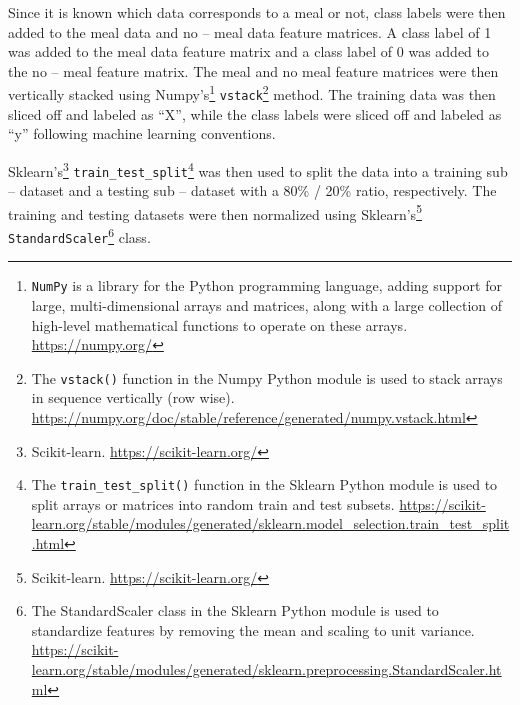 Since it is known which data corresponds to a meal or not, class labels were then added to the meal data and no -- meal data feature matrices.  A class label of 1 was added to the meal data feature matrix and a class label of 0 was added to the no -- meal feature matrix.  The meal and no meal feature matrices were then vertically stacked using Numpy's\footnote{\texttt{NumPy} is a library for the Python programming language, adding support for large, multi-dimensional arrays and matrices, along with a large collection of high-level mathematical functions to operate on these arrays. \url{https://numpy.org/}} \texttt{vstack}\footnote{The \texttt{vstack()} function in the Numpy Python module is used to stack arrays in sequence vertically (row wise). \href{https://numpy.org/doc/stable/reference/generated/numpy.vstack.html}{https://numpy.org/doc/stable/reference/generated/numpy.vstack.html}} method.  The training data was then sliced off and labeled as ``X'', while the class labels were sliced off and labeled as ``y'' following machine learning conventions.

Sklearn's\footnote{Scikit-learn. \href{https://scikit-learn.org/}{https://scikit-learn.org/}} \texttt{train\_test\_split}\footnote{The \texttt{train\_test\_split()} function in the Sklearn Python module is used to split arrays or matrices into random train and test subsets. \href{https://scikit-learn.org/stable/modules/generated/sklearn.model\_selection.train\_test\_split.html}{https://scikit-learn.org/stable/modules/generated/sklearn.model\_selection.train\_test\_split.html}} was then used to split the data into a training sub -- dataset and a testing sub -- dataset with a 80\% / 20\% ratio, respectively.  The training and testing datasets were then normalized using Sklearn's\footnote{Scikit-learn. \href{https://scikit-learn.org/}{https://scikit-learn.org/}} \texttt{StandardScaler}\footnote{The StandardScaler class in the Sklearn Python module is used to standardize features by removing the mean and scaling to unit variance. \href{https://scikit-learn.org/stable/modules/generated/sklearn.preprocessing.StandardScaler.html}{https://scikit-learn.org/stable/modules/generated/sklearn.preprocessing.StandardScaler.html}} class.

